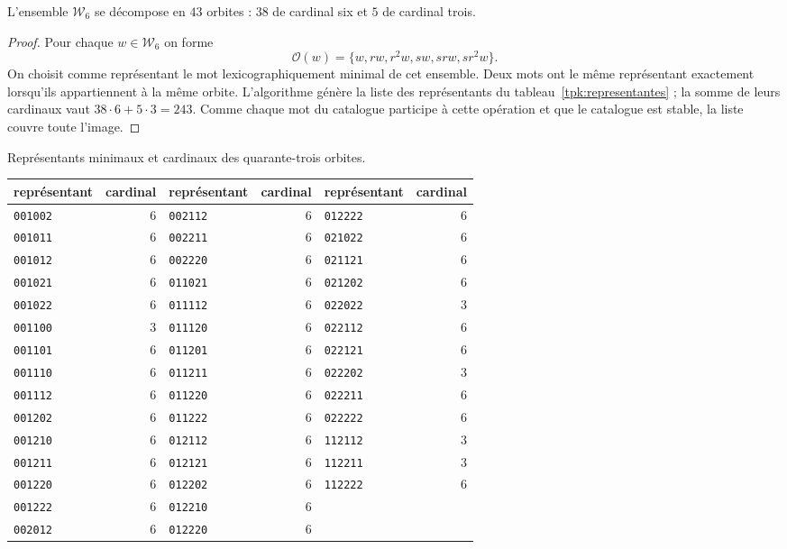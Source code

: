 \begin{proposicion}
\label{tpk:43}
L'ensemble \(\mathcal W_6\) se décompose en \(43\) orbites : \(38\)
de cardinal six et \(5\) de cardinal trois.
\end{proposicion}
\begin{proof}
Pour chaque \(w\in\mathcal W_6\) on forme
\[
 \mathcal O(w)=\{w,rw,r^2w,sw,srw,sr^2w\}.
\]
On choisit comme représentant le mot lexicographiquement minimal de cet ensemble. Deux mots ont le même représentant exactement lorsqu'ils appartiennent à la même orbite. L'algorithme génère la liste des représentants du tableau~\ref{tpk:representantes} ; la somme de leurs cardinaux vaut \(38\cdot6+5\cdot3=243\). Comme chaque mot du catalogue participe à cette opération et que le catalogue est stable, la liste couvre toute l'image.
\end{proof}

\begin{tablacompleta}[htbp]
\caption{Représentants minimaux et cardinaux des quarante-trois orbites.}
\label{tpk:representantes}
\small
\begin{tabular}{@{}lr@{\qquad}lr@{\qquad}lr@{}}
\toprule
représentant&cardinal&représentant&cardinal&représentant&cardinal\\
\midrule
\texttt{001002}&6&\texttt{002112}&6&\texttt{012222}&6\\
\texttt{001011}&6&\texttt{002211}&6&\texttt{021022}&6\\
\texttt{001012}&6&\texttt{002220}&6&\texttt{021121}&6\\
\texttt{001021}&6&\texttt{011021}&6&\texttt{021202}&6\\
\texttt{001022}&6&\texttt{011112}&6&\texttt{022022}&3\\
\texttt{001100}&3&\texttt{011120}&6&\texttt{022112}&6\\
\texttt{001101}&6&\texttt{011201}&6&\texttt{022121}&6\\
\texttt{001110}&6&\texttt{011211}&6&\texttt{022202}&3\\
\texttt{001112}&6&\texttt{011220}&6&\texttt{022211}&6\\
\texttt{001202}&6&\texttt{011222}&6&\texttt{022222}&6\\
\texttt{001210}&6&\texttt{012112}&6&\texttt{112112}&3\\
\texttt{001211}&6&\texttt{012121}&6&\texttt{112211}&3\\
\texttt{001220}&6&\texttt{012202}&6&\texttt{112222}&6\\
\texttt{001222}&6&\texttt{012210}&6&&\\
\texttt{002012}&6&\texttt{012220}&6&&\\
\bottomrule
\end{tabular}
\end{tablacompleta}

